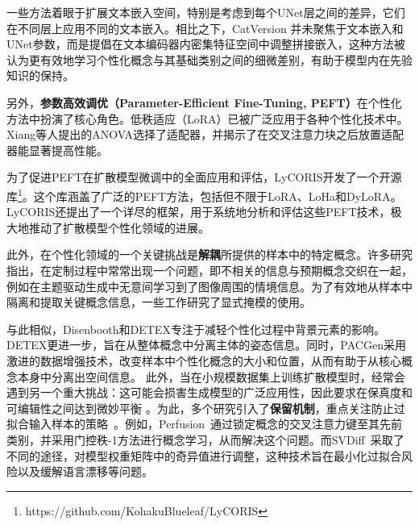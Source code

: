 一些方法着眼于扩展文本嵌入空间，特别是考虑到每个UNet层之间的差异\cite{voynov2023p+,zhang2023prospect}，它们在不同层上应用不同的文本嵌入。相比之下，CatVersion \cite{zhao2023catversion}并未聚焦于文本嵌入和UNet参数，而是提倡在文本编码器内密集特征空间中调整拼接嵌入，这种方法被认为更有效地学习个性化概念与其基础类别之间的细微差别，有助于模型内在先验知识的保持。

另外，\textbf{参数高效调优（Parameter-Efficient Fine-Tuning, PEFT）}\cite{houlsby2019parameter,hu2021lora, valipour2022dylora,chavan2023one}在个性化方法中扮演了核心角色。低秩适应（LoRA）\cite{hu2021lora}已被广泛应用于各种个性化技术中\cite{ruiz2023dreambooth,chen2023disenbooth,gu2023mix,smith2023continual,guo2023animatediff}。Xiang等人提出的ANOVA\cite{xiang2023closer}选择了适配器\cite{houlsby2019parameter}，并揭示了在交叉注意力块之后放置适配器能显著提高性能。

为了促进PEFT在扩散模型微调中的全面应用和评估，LyCORIS\cite{yeh2023navigating}开发了一个开源库\footnote{https://github.com/KohakuBlueleaf/LyCORIS}。这个库涵盖了广泛的PEFT方法，包括但不限于LoRA\cite{hu2021lora}、LoHa和DyLoRA\cite{valipour2022dylora}。LyCORIS还提出了一个详尽的框架，用于系统地分析和评估这些PEFT技术，极大地推动了扩散模型个性化领域的进展。

此外，在个性化领域的一个关键挑战是\textbf{解耦}所提供的样本中的特定概念。许多研究\cite{avrahami2023break,chen2023disenbooth,cai2023decoupled,li2023generate,motamed2023lego}指出，在定制过程中常常出现一个问题，即不相关的信息与预期概念交织在一起，例如在主题驱动生成中无意间学习到了图像周围的情境信息。为了有效地从样本中隔离和提取关键概念信息，一些工作\cite{avrahami2023break,jin2023image,safaee2023clic}研究了显式掩模的使用。

与此相似，Disenbooth\cite{chen2023disenbooth}和DETEX\cite{cai2023decoupled}专注于减轻个性化过程中背景元素的影响。DETEX更进一步，旨在从整体概念中分离主体的姿态信息。同时，PACGen\cite{li2023generate}采用激进的数据增强技术，改变样本中个性化概念的大小和位置，从而有助于从核心概念本身中分离出空间信息。
此外，当在小规模数据集上训练扩散模型时，经常会遇到另一个重大挑战：这可能会损害生成模型的广泛应用性，因此要求在保真度和可编辑性之间达到微妙平衡 \cite{hua2023dreamtuner}。为此，多个研究引入了\textbf{保留机制}，重点关注防止过拟合输入样本的策略~\cite{ruiz2023dreambooth,kumari2023multi,tewel2023key,qiu2023controlling,han2023svdiff,wang2023hifi}。例如，Perfusion~\cite{tewel2023key}通过锁定概念的交叉注意力键至其先前类别，并采用门控秩-1方法进行概念学习，从而解决这个问题。而SVDiff~\cite{han2023svdiff}采取了不同的途径，对模型权重矩阵中的奇异值进行调整，这种技术旨在最小化过拟合风险以及缓解语言漂移等问题。

